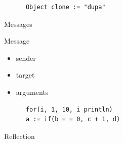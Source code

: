 \begin{frame}[fragile]
  \begin{center}
    \begin{lstlisting}
      Object clone := "dupa"
    \end{lstlisting}
  \end{center}
\end{frame}

\begin{frame}
  \begin{center}
    Messages
  \end{center}
\end{frame}  

\begin{frame}
  \begin{center}
    Message
    \begin{itemize}
      \item<2-> sender
      \item<3-> target
      \item<4-> arguments
    \end{itemize}
  \end{center}
\end{frame}

\begin{frame}[fragile]
  \begin{center}
    \begin{lstlisting}
      for(i, 1, 10, i println)
      a := if(b = = 0, c + 1, d)
    \end{lstlisting}
  \end{center}
\end{frame}

\begin{frame}
  \begin{center}
    Reflection
  \end{center}
\end{frame}
  
